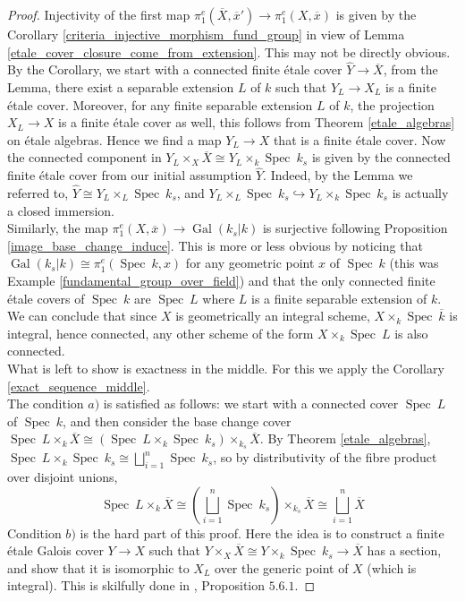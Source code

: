 \documentclass{article}
\theoremstyle{plain}
\theoremstyle{definition}
\DeclareMathOperator{\Spec}{Spec}
\DeclareMathOperator{\Gal}{Gal}
\begin{document}
\begin{proof}
    Injectivity of the first map $\pi^e_1(\overline{X}, \overline{x}')\rightarrow \pi^e_1(X,\overline{x})$ is given by the Corollary \ref{criteria_injective_morphism_fund_group} in view of Lemma \ref{etale_cover_closure_come_from_extension}.
    This may not be directly obvious. 
    By the Corollary, we start with a connected finite \'etale cover $\hat{Y}\rightarrow \overline{X}$, from the Lemma, there exist a separable extension $L$ of $k$ such that $Y_L\rightarrow X_L$ is a finite \'etale cover. 
    Moreover, for any finite separable extension $L$ of $k$, the projection $X_L\rightarrow X$ is a finite \'etale cover as well, this follows from Theorem \ref{etale_algebras} on \'etale algebras. 
    Hence we find a map $Y_L\rightarrow X$ that is a finite \'etale cover.
    Now the connected component in $Y_L\times_X\overline{X} \cong Y_L\times_k \Spec\:k_s$ is given by the connected finite \'etale cover from our initial assumption $\hat{Y}$. 
    Indeed, by the Lemma we referred to, $\hat{Y}\cong Y_L\times_L \Spec\:k_s$, and $Y_L\times_L \Spec\:k_s \hookrightarrow Y_L\times_k \Spec\:k_s$ is actually a closed immersion.\\
    Similarly, the map $\pi^e_1(X,\overline{x})\rightarrow \Gal(k_s|k)$ is surjective following Proposition \ref{image_base_change_induce}. This is more or less obvious by noticing that $\Gal(k_s|k)\cong \pi^e_1(\Spec\:k, x)$ for any geometric point $x$ of $\Spec\:k$ (this was Example \ref{fundamental_group_over_field}) and that the only connected finite \'etale covers of $\Spec\: k$ are $\Spec\:L$ where $L$ is a finite separable extension of $k$. We can conclude that since $X$ is geometrically an integral scheme, $X\times_k\Spec\:\overline{k}$ is integral, hence connected, any other scheme of the form $X\times_k\Spec\:L$ is also connected.\\
    What is left to show is exactness in the middle.
    For this we apply the Corollary \ref{exact_sequence_middle}.\\
    The condition $a)$ is satisfied as follows:
    we start with a connected cover $\Spec\:L$ of $\Spec\:k$, and then consider the base change cover $\Spec\:L \times_k \overline{X} \cong (\Spec\:L\times_k \Spec\:k_s) \times_{k_s} \overline{X}$.
    By Theorem \ref{etale_algebras}, $\Spec\:L\times_k \Spec\:k_s \cong \bigsqcup^n_{i=1} \Spec\:k_s$, so by distributivity of the fibre product over disjoint unions, 
    $$\Spec\:L \times_k \overline{X} \cong (\bigsqcup^n_{i=1} \Spec\:k_s) \times_{k_s} \overline{X} \cong \bigsqcup^n_{i=1} \overline{X}$$
    Condition $b)$ is the hard part of this proof.
    Here the idea is to construct a finite \'etale Galois cover $Y\rightarrow X$ such that $Y\times_X\overline{X} \cong Y\times_k\Spec\:k_s \rightarrow \overline{X}$ has a section, and show that it is isomorphic to $X_L$ over the generic point of $X$ (which is integral). This is skilfully done in \cite{Szamuely}, Proposition $5.6.1$.
    

\end{proof}
\end{document}
